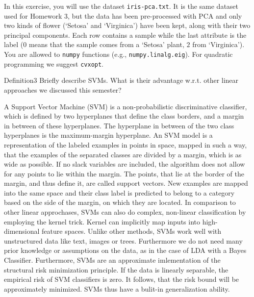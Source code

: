 \newif\ifvimbug
\vimbugfalse

\ifvimbug

\fi

In this exercise, you will use the dataset \texttt{iris-pca.txt}. It is the same dataset used for Homework 3, but the data has been pre-processed with PCA and only two kinds of flower (`Setosa' and `Virginica') have been kept, along with their two principal components. Each row contains a sample while the last attribute is the label ($0$ means that the sample comes from a `Setosa' plant, $2$ from `Virginica').
\\You are allowed to \texttt{numpy} functions (e.g., \texttt{numpy.linalg.eig}). For quadratic programming we suggest \texttt{cvxopt}.
\begin{questions}


\begin{question}{Definition}{3}
Briefly describe SVMs. What is their advantage w.r.t. other linear approaches we discussed this semester? 

\begin{answer}
A Support Vector Machine (SVM) is a non-probabilistic discriminative classifier, which is defined by two hyperplanes that define the class borders, and a margin in between of these hyperplanes. The hyperplane in between of the two class hyperplanes is the maximum-margin hyperplane. An SVM model is a representation of the labeled examples in points in space, mapped in such a way, that the examples of the separated classes are divided by a margin, which is as wide as possible. If no slack variables are included, the algorithm does not allow for any points to lie within the margin. The points, that lie at the border of the margin, and thus define it, are called support vectors. New examples are mapped into the same space and their class label is predicted to belong to a category based on the side of the margin, on which they are located.
In comparison to other linear approchases, SVMs can also do complex, non-linear classification by employing the kernel trick. Kernel can implicitly map inputs into high-dimensional feature spaces. Unlike other methods, SVMs work well with unstructured data like text, images or trees. Furthermore we do not need many prior knowledge or assumptions on the data, as in the case of LDA with a Bayes Classifier.
Furthermore, SVMs are an approximate imlementation of the structural risk minimization principle. If the data is linearly separable, the empirical risk of SVM classifiers is zero. It follows, that the risk bound will be approximately minimized. SVMs thus have a bulit-in generalization ability.
\end{answer}
\end{question}


\end{questions}

